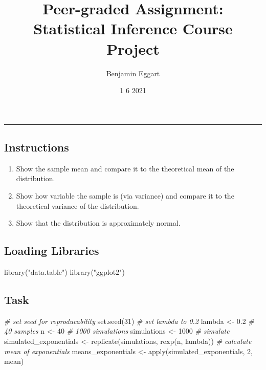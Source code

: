 \documentclass[
]{article}
\title{Peer-graded Assignment: Statistical Inference Course Project}
\author{Benjamin Eggart}
\date{1 6 2021}
\newenvironment{Shaded}{\begin{snugshade}}{\end{snugshade}}
\newcommand{\CommentTok}[1]{\textcolor[rgb]{0.56,0.35,0.01}{\textit{#1}}}
\newcommand{\DecValTok}[1]{\textcolor[rgb]{0.00,0.00,0.81}{#1}}
\newcommand{\FloatTok}[1]{\textcolor[rgb]{0.00,0.00,0.81}{#1}}
\newcommand{\FunctionTok}[1]{\textcolor[rgb]{0.00,0.00,0.00}{#1}}
\newcommand{\NormalTok}[1]{#1}
\newcommand{\OtherTok}[1]{\textcolor[rgb]{0.56,0.35,0.01}{#1}}
\newcommand{\StringTok}[1]{\textcolor[rgb]{0.31,0.60,0.02}{#1}}
\providecommand{\tightlist}{%
  \setlength{\itemsep}{0pt}\setlength{\parskip}{0pt}}
\begin{document}
\maketitle

\begin{center}\rule{0.5\linewidth}{0.5pt}\end{center}

\hypertarget{instructions}{%
\subsection{Instructions}\label{instructions}}

\begin{enumerate}
\def\labelenumi{\arabic{enumi}.}
\tightlist
\item
  Show the sample mean and compare it to the theoretical mean of the
  distribution.
\item
  Show how variable the sample is (via variance) and compare it to the
  theoretical variance of the distribution.
\item
  Show that the distribution is approximately normal.
\end{enumerate}

\hypertarget{loading-libraries}{%
\subsection{Loading Libraries}\label{loading-libraries}}

\begin{Shaded}
\begin{Highlighting}[]
\FunctionTok{library}\NormalTok{(}\StringTok{"data.table"}\NormalTok{)}
\FunctionTok{library}\NormalTok{(}\StringTok{"ggplot2"}\NormalTok{)}
\end{Highlighting}
\end{Shaded}

\hypertarget{task}{%
\subsection{Task}\label{task}}

\begin{Shaded}
\begin{Highlighting}[]
\CommentTok{\# set seed for reproducability}
\FunctionTok{set.seed}\NormalTok{(}\DecValTok{31}\NormalTok{)}
\CommentTok{\# set lambda to 0.2}
\NormalTok{lambda }\OtherTok{\textless{}{-}} \FloatTok{0.2}
\CommentTok{\# 40 samples}
\NormalTok{n }\OtherTok{\textless{}{-}} \DecValTok{40}
\CommentTok{\# 1000 simulations}
\NormalTok{simulations }\OtherTok{\textless{}{-}} \DecValTok{1000}
\CommentTok{\# simulate}
\NormalTok{simulated\_exponentials }\OtherTok{\textless{}{-}} \FunctionTok{replicate}\NormalTok{(simulations, }\FunctionTok{rexp}\NormalTok{(n, lambda))}
\CommentTok{\# calculate mean of exponentials}
\NormalTok{means\_exponentials }\OtherTok{\textless{}{-}} \FunctionTok{apply}\NormalTok{(simulated\_exponentials, }\DecValTok{2}\NormalTok{, mean)}
\end{Highlighting}
\end{Shaded}
\end{document}
